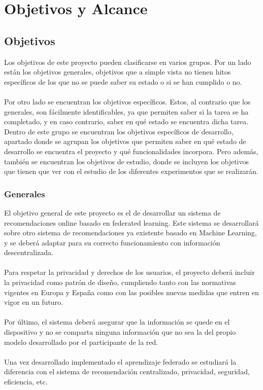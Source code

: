 \chapter{Objetivos y Alcance}
\thispagestyle{fancy}
\section{Objetivos}
Los objetivos de este proyecto pueden clasificarse en varios grupos. Por un lado están los objetivos generales, objetivos que a simple vista no tienen hitos específicos de los que no se puede saber su estado o si se han cumplido o no.
\\ \\
Por otro lado se encuentran los objetivos específicos. Estos, al contrario que los generales, son fácilmente identificables, ya que permiten saber si la tarea se ha completado, y en caso contrario, saber en qué estado se encuentra dicha tarea. Dentro de este grupo se encuentran los objetivos específicos de desarrollo, apartado donde se agrupan los objetivos que permiten saber en qué estado de desarrollo se encuentra el proyecto y qué funcionalidades incorpora. Pero además, también se encuentran los objetivos de estudio, donde se incluyen los objetivos que tienen que ver con el estudio de los diferentes experimentos que se realizarán. 

\subsection{Generales}
El objetivo general de este proyecto es el de desarrollar un sistema de recomendaciones online basado en federated learning. Este sistema se desarrollará sobre otro sistema de recomendaciones ya existente basado en Machine Learning, y se deberá adaptar para su correcto funcionamiento con información descentralizada.
\\ \\
Para respetar la privacidad y derechos de los usuarios, el proyecto deberá incluir la privacidad como patrón de diseño, cumpliendo tanto con las normativas vigentes en Europa y España como con las posibles nuevas medidas que entren en vigor en un futuro. 
\\ \\
Por último, el sistema deberá asegurar que la información se quede en el dispositivo y no se comparta ninguna información que no sea la del propio modelo desarrollado por el participante de la red.
\\ \\
Una vez desarrollado implementado el aprendizaje federado se estudiará la diferencia con el sistema de recomendación centralizado, privacidad, seguridad, eficiencia, etc.

